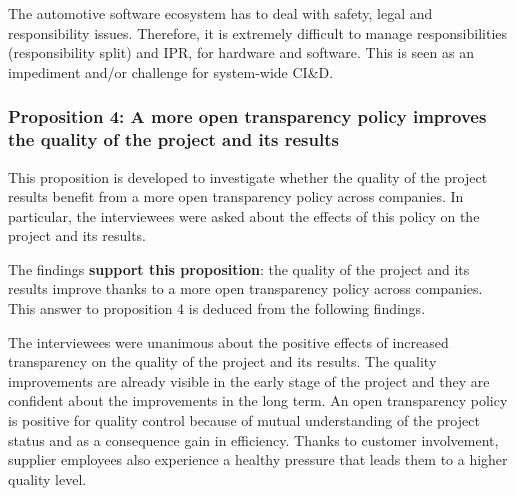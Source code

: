  The automotive software ecosystem has to deal with safety, legal and responsibility issues. Therefore, it is extremely difficult to manage responsibilities (responsibility split) and IPR, for hardware and software. This is seen as an impediment and/or challenge for system-wide CI\&D.

\vspace{.2cm}
\subsubsection{Proposition 4: A more open transparency policy improves the quality of the project and its results}

%
%
%

This proposition is developed to investigate whether the quality of the project results benefit from a more open transparency policy across companies. In particular, the interviewees were asked about the effects of this policy on the project and its results.

The findings {\bf support this proposition}:  the quality of the project and its results improve thanks to a more open transparency policy across companies. This answer to proposition 4 is deduced from the following findings.

 The interviewees were unanimous about the positive effects of increased transparency on the quality of the project and its results. The quality improvements are already visible in the early stage of the project and they are confident about the improvements in the long term. An open transparency policy is positive for quality control because of mutual understanding of the project status and as a consequence gain in efficiency. Thanks to customer involvement, supplier employees also experience a healthy pressure that leads them to a higher quality level.

